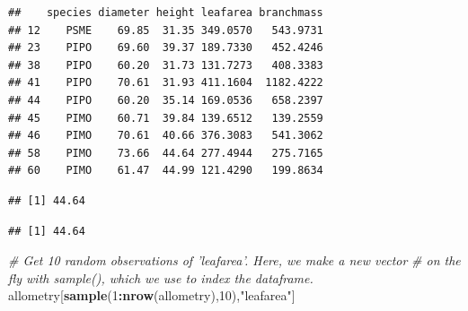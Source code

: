 \documentclass[]{book}
\newenvironment{Shaded}{\begin{snugshade}}{\end{snugshade}}
\newcommand{\CommentTok}[1]{\textcolor[rgb]{0.56,0.35,0.01}{\textit{#1}}}
\newcommand{\DecValTok}[1]{\textcolor[rgb]{0.00,0.00,0.81}{#1}}
\newcommand{\KeywordTok}[1]{\textcolor[rgb]{0.13,0.29,0.53}{\textbf{#1}}}
\newcommand{\NormalTok}[1]{#1}
\newcommand{\OperatorTok}[1]{\textcolor[rgb]{0.81,0.36,0.00}{\textbf{#1}}}
\newcommand{\StringTok}[1]{\textcolor[rgb]{0.31,0.60,0.02}{#1}}
\begin{document}
\begin{Shaded}
\end{Shaded}

\begin{verbatim}
##    species diameter height leafarea branchmass
## 12    PSME    69.85  31.35 349.0570   543.9731
## 23    PIPO    69.60  39.37 189.7330   452.4246
## 38    PIPO    60.20  31.73 131.7273   408.3383
## 41    PIPO    70.61  31.93 411.1604  1182.4222
## 44    PIPO    60.20  35.14 169.0536   658.2397
## 45    PIMO    60.71  39.84 139.6512   139.2559
## 46    PIMO    70.61  40.66 376.3083   541.3062
## 58    PIMO    73.66  44.64 277.4944   275.7165
## 60    PIMO    61.47  44.99 121.4290   199.8634
\end{verbatim}

\begin{Shaded}
\end{Shaded}

\begin{verbatim}
## [1] 44.64
\end{verbatim}

\begin{Shaded}
\end{Shaded}

\begin{verbatim}
## [1] 44.64
\end{verbatim}

\begin{Shaded}
\begin{Highlighting}[]
\CommentTok{# Get 10 random observations of 'leafarea'. Here, we make a new vector }
\CommentTok{# on the fly with sample(), which we use to index the dataframe.}
\NormalTok{allometry[}\KeywordTok{sample}\NormalTok{(}\DecValTok{1}\OperatorTok{:}\KeywordTok{nrow}\NormalTok{(allometry),}\DecValTok{10}\NormalTok{),}\StringTok{"leafarea"}\NormalTok{]}
\end{Highlighting}
\end{Shaded}
\end{document}
